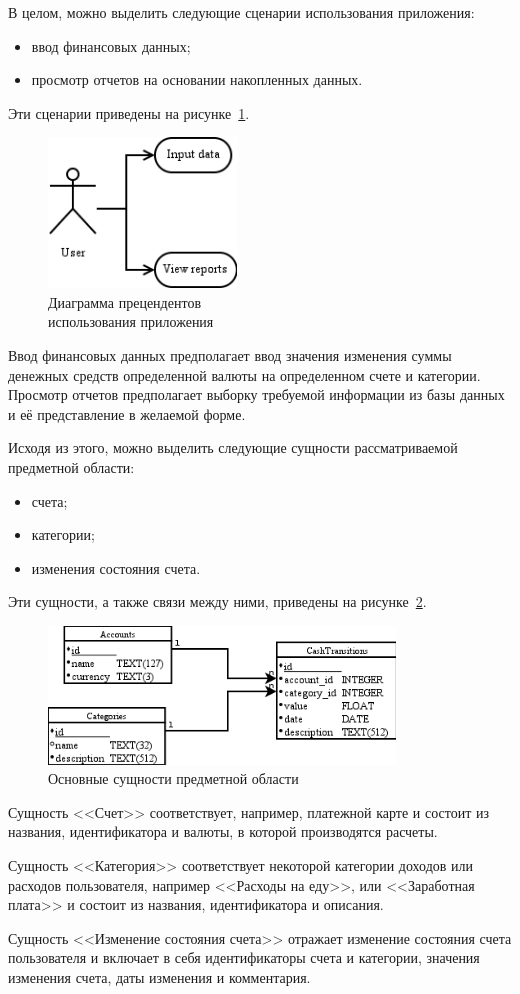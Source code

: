 В целом, можно выделить следующие сценарии использования приложения:
\begin{itemize}
  \item ввод финансовых данных;
  \item просмотр отчетов на основании накопленных данных.
\end{itemize}

Эти сценарии приведены на рисунке~\ref{fig:use_cases}.

\begin{figure}[h!]
  \centering
  \includegraphics[width=50mm]{pic/use_cases}
  \caption{Диаграмма прецендентов \\ использования приложения}
  \label{fig:use_cases}
\end{figure}

Ввод финансовых данных предполагает ввод значения изменения суммы
денежных средств определенной валюты на определенном счете и категории.
Просмотр отчетов предполагает выборку требуемой информации из базы данных и
её представление в желаемой форме.

Исходя из этого, можно выделить следующие сущности рассматриваемой
предметной области:
\begin{itemize}
\item счета;
\item категории;
\item изменения состояния счета.
\end{itemize}

Эти сущности, а также связи между ними, приведены на рисунке~\ref{fig:entities}.

\begin{figure}[h!]
  \centering
  \includegraphics[width=92mm]{pic/entities}
  \caption{Основные сущности предметной области}
  \label{fig:entities}
\end{figure}

Сущность <<Счет>> соответствует, например, платежной карте
и состоит из названия, идентификатора и валюты, в которой производятся расчеты.

Сущность <<Категория>> соответствует некоторой категории доходов или расходов
пользователя, например <<Расходы на еду>>, или <<Заработная плата>>
и состоит из названия, идентификатора и описания.

Сущность <<Изменение состояния счета>> отражает изменение состояния счета
пользователя и включает в себя идентификаторы счета и категории,
значения изменения счета, даты изменения и комментария.